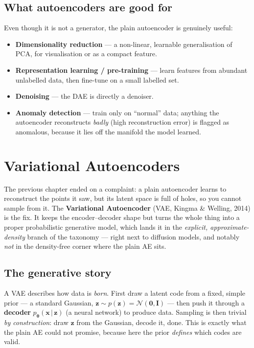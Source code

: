 \documentclass[11pt, oneside]{book}
\newcommand{\eye}{\mathbf{I}}
\newcommand{\zeros}{\mathbf{0}}
\newcommand{\params}{\boldsymbol{\theta}}
\newcommand{\xvec}{\mathbf{x}}
\newcommand{\zvec}{\mathbf{z}}
\newcommand{\Normal}{\mathcal{N}}
\newcommand{\given}{\,\vert\,}
\begin{document}
\section{What autoencoders are good for}

Even though it is not a generator, the plain autoencoder is genuinely useful:
\begin{itemize}
  \item \textbf{Dimensionality reduction} --- a non-linear, learnable
        generalisation of PCA, for visualisation or as a compact feature.
  \item \textbf{Representation learning / pre-training} --- learn features from
        abundant unlabelled data, then fine-tune on a small labelled set.
  \item \textbf{Denoising} --- the DAE is directly a denoiser.
  \item \textbf{Anomaly detection} --- train only on ``normal'' data; anything the
        autoencoder reconstructs \emph{badly} (high reconstruction error) is
        flagged as anomalous, because it lies off the manifold the model learned.
\end{itemize}


\chapter{Variational Autoencoders}

The previous chapter ended on a complaint: a plain autoencoder learns to
reconstruct the points it saw, but its latent space is full of holes, so you
cannot sample from it. The \textbf{Variational Autoencoder} (VAE, Kingma \&
Welling, 2014) is the fix. It keeps the encoder--decoder shape but turns the whole
thing into a proper probabilistic generative model, which lands it in the
\emph{explicit, approximate-density} branch of the taxonomy --- right next to
diffusion models, and notably \emph{not} in the density-free corner where the
plain AE sits.

\section{The generative story}

A VAE describes how data is \emph{born}. First draw a latent code from a fixed,
simple prior --- a standard Gaussian, $\zvec \sim p(\zvec) = \Normal(\zeros,
\eye)$ --- then push it through a \textbf{decoder} $p_{\params}(\xvec \given
\zvec)$ (a neural network) to produce data. Sampling is then trivial \emph{by
construction}: draw $\zvec$ from the Gaussian, decode it, done. This is exactly
what the plain AE could not promise, because here the prior \emph{defines} which
codes are valid.
\end{document}
